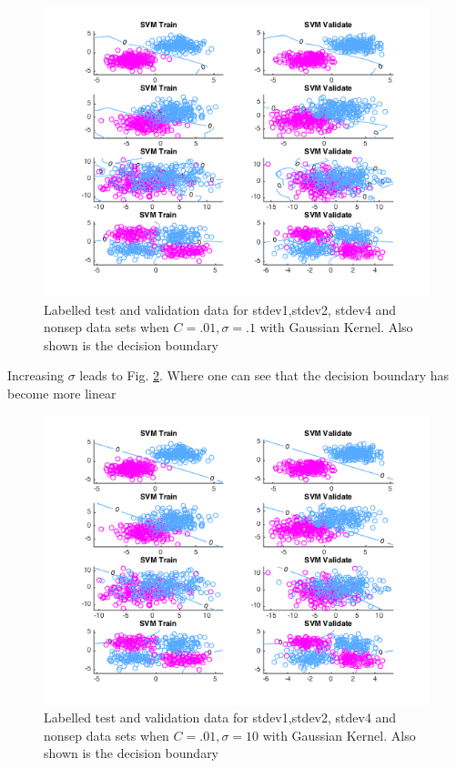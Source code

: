 \documentclass[12pt, twocolumn]{article}
\begin{document}
 \begin{figure}[H]
\center
\includegraphics[scale =.4]{Cpt01BWpt1.png}
\caption{Labelled test and validation data for stdev1,stdev2, stdev4 and nonsep data sets when $C=.01, \sigma =.1$ with Gaussian Kernel. Also shown is the decision boundary }
\label{SVM Gauss C01}
\end{figure}
 
 Increasing $\sigma$ leads to Fig. \ref{SVM Gauss C10}. Where one can see that the decision boundary has become more linear
 \begin{figure}[H]
\center
\includegraphics[scale =.4]{Cpt01BW10.png}
\caption{Labelled test and validation data for stdev1,stdev2, stdev4 and nonsep data sets when $C=.01, \sigma =10$ with Gaussian Kernel. Also shown is the decision boundary }
\label{SVM Gauss C10}
\end{figure}
\end{document}

